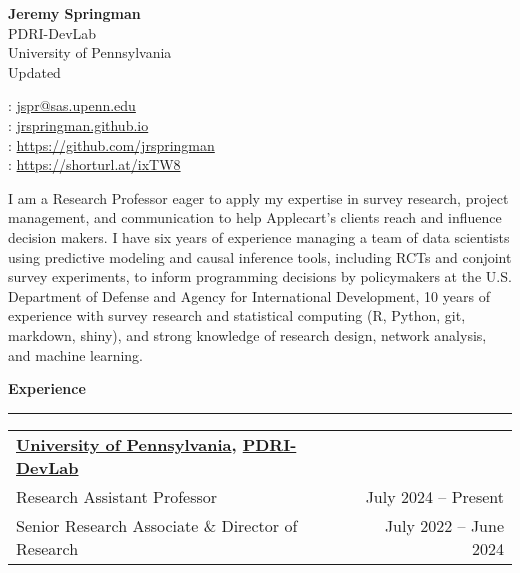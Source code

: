 \documentclass[11pt]{article}
\renewcommand{\today}{\monthname[\the\month] \the\year}
\begin{document}



\begin{multicols}{2}
{\Large {\bf Jeremy Springman}}\\
PDRI-DevLab\\
University of Pennsylvania\\
Updated \today \\

\columnbreak
\begin{flushright}

\faEnvelope: \href{mailto:jspr@sas.upenn.edu}{jspr@sas.upenn.edu}\\
\faLaptop: \url{jrspringman.github.io}\\
\faGithub: \url{https://github.com/jrspringman}\\
\aiGoogleScholar:  \url{https://shorturl.at/ixTW8}\\
\end{flushright}
\end{multicols}

I am a Research Professor eager to apply my expertise in survey research, project management, and communication to help Applecart's clients reach and influence decision makers. I have six years of experience managing a team of data scientists using predictive modeling and causal inference tools, including RCTs and conjoint survey experiments, to inform programming decisions by policymakers at the U.S. Department of Defense and Agency for International Development, 10 years of experience with survey research and statistical computing (R, Python, git, markdown, shiny), and strong knowledge of research design, network analysis, and machine learning.

\textbf{\large Experience}\\
\rule[3mm]{\textwidth}{.2pt}
\noindent\begin{tabular*}{\textwidth}{@{}l@{\extracolsep{\fill}}r@{}}
\textbf{\href{https://www.polisci.upenn.edu/}{University of Pennsylvania}, \href{https://web.sas.upenn.edu/dev-lab/}{PDRI-DevLab}}\\
Research Assistant Professor & July 2024 -- Present\\
Senior Research Associate \& Director of Research & July 2022 -- June 2024\\
\end{tabular*}
\end{document}
